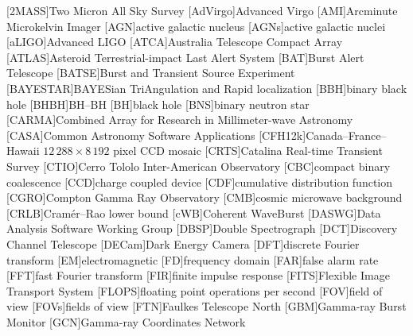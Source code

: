 \providecommand{\acrolowercase}[1]{\lowercase{#1}}

\begin{acronym}
[2MASS]{Two Micron All Sky Survey}
[AdVirgo]{Advanced Virgo}
[AMI]{Arcminute Microkelvin Imager}
[AGN]{active galactic nucleus}
[AGN\acrolowercase{s}]{active galactic nuclei}
[aLIGO]{Advanced \acs{LIGO}}
[ATCA]{Australia Telescope Compact Array}
[ATLAS]{Asteroid Terrestrial-impact Last Alert System}
[BAT]{Burst Alert Telescope}
[BATSE]{Burst and Transient Source Experiment}
[BAYESTAR]{BAYESian TriAngulation and Rapid localization}
[BBH]{binary black hole}
[BHBH]{\acl{BH}\nobreakdashes--\acl{BH}}
[BH]{black hole}
[BNS]{binary neutron star}
[CARMA]{Combined Array for Research in Millimeter\nobreakdashes-wave Astronomy}
[CASA]{Common Astronomy Software Applications}
[CFH12k]{Canada--France--Hawaii $12\,288 \times 8\,192$ pixel CCD mosaic}
[CRTS]{Catalina Real-time Transient Survey}
[CTIO]{Cerro Tololo Inter-American Observatory}
[CBC]{compact binary coalescence}
[CCD]{charge coupled device}
[CDF]{cumulative distribution function}
[CGRO]{Compton Gamma Ray Observatory}
[CMB]{cosmic microwave background}
[CRLB]{Cram\'{e}r\nobreakdashes--Rao lower bound}
[\acrolowercase{c}WB]{Coherent WaveBurst}
[DASWG]{Data Analysis Software Working Group}
[DBSP]{Double Spectrograph}
[DCT]{Discovery Channel Telescope}
[DECam]{Dark Energy Camera}
[DFT]{discrete Fourier transform}
[EM]{electromagnetic}
[FD]{frequency domain}
[FAR]{false alarm rate}
[FFT]{fast Fourier transform}
[FIR]{finite impulse response}
[FITS]{Flexible Image Transport System}
[FLOPS]{floating point operations per second}
[FOV]{field of view}
[FOV\acrolowercase{s}]{fields of view}
[FTN]{Faulkes Telescope North}
[GBM]{Gamma-ray Burst Monitor}
[GCN]{Gamma-ray Coordinates Network}

\end{acronym}
